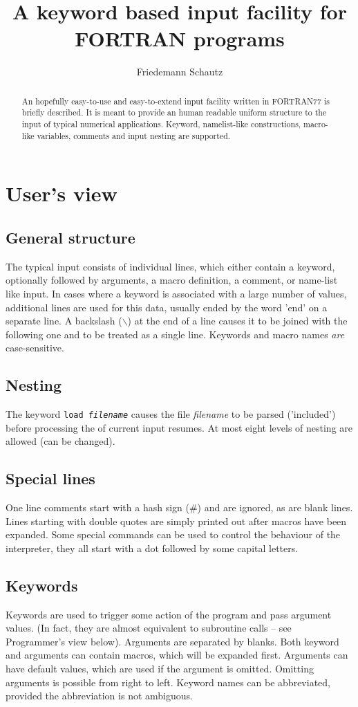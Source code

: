 \documentclass[a4paper]{article}
\title{A keyword based input facility for FORTRAN programs}
\author{Friedemann Schautz}
\begin{document}
\maketitle
\begin{abstract}
An hopefully easy-to-use and easy-to-extend input facility written
in FORTRAN77 is briefly described. It is meant to provide 
an human readable uniform structure to the input of typical
numerical applications. Keyword, namelist-like constructions,
macro-like variables, comments and input nesting are supported.
\end{abstract} 
\section{User's view}
\subsection{General structure}
The typical input consists of individual lines, which either 
contain a keyword, optionally followed by arguments, a macro definition,
a comment, or name-list like input. In cases where a keyword is associated
with a large number of values, additional lines are used for this data,
usually ended by the word 'end' on a separate line. A backslash ($\backslash$) 
at the end of a line causes it to be joined with the following one and 
to be treated as a single line. Keywords and macro names {\em are} case-sensitive. 

\subsection{Nesting}
The keyword {\tt load \em filename} causes the file {\em filename} to be
parsed ('included') before processing the of current input resumes. At most
eight levels of nesting are allowed (can be changed). 

\subsection{Special lines}
One line comments start with a hash sign ($\#$) and are ignored, as are blank
lines. Lines starting with double quotes are simply printed out after
macros have been expanded. Some special commands can be used to control
the behaviour of the interpreter, they all start with a dot followed by 
some capital letters. 

\subsection{Keywords}
Keywords are used to trigger some action of the program and pass argument 
values. (In fact, they are almost equivalent to subroutine calls -- see
Programmer's view below). Arguments are separated by blanks. Both keyword
and arguments can contain macros, which will be expanded first. 
Arguments can have default values, which are used if the argument is
omitted. Omitting arguments is possible from right to left.  
Keyword names can be abbreviated, provided the abbreviation is not ambiguous.
\end{document}
